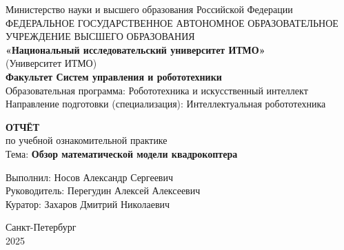 \thispagestyle{empty}
\begin{center}
Министерство науки и высшего образования Российской Федерации\\
ФЕДЕРАЛЬНОЕ ГОСУДАРСТВЕННОЕ АВТОНОМНОЕ ОБРАЗОВАТЕЛЬНОЕ УЧРЕЖДЕНИЕ ВЫСШЕГО ОБРАЗОВАНИЯ\\
\textbf{«Национальный исследовательский университет ИТМО»}\\
(Университет ИТМО)\\
\vspace{1cm}
\textbf{Факультет Систем управления и робототехники}\\
Образовательная программа: Робототехника и искусственный интеллект\\
Направление подготовки (специализация): Интеллектуальная робототехника\\

\end{center}

\vspace{2cm}
\begin{center}
\textbf{ОТЧЁТ}\\
по учебной ознакомительной практике\\
Тема: \textbf{Обзор математической модели квадрокоптера}
\end{center}

\vspace{3cm}
\begin{flushright}
Выполнил: Носов Александр Сергеевич\\
Руководитель: Перегудин Алексей Алексеевич\\
Куратор: Захаров Дмитрий Николаевич
\end{flushright}

\vspace{5cm}
\begin{center}
Санкт-Петербург\\
2025
\end{center}

\endinput
